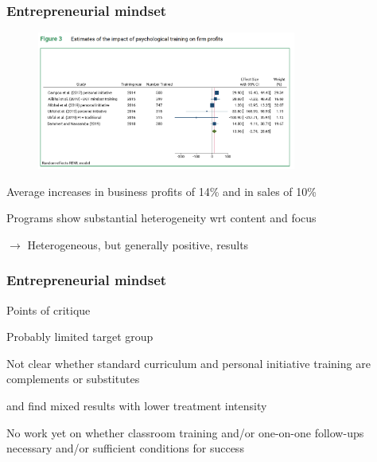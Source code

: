 \documentclass[hideothersubsections, usenames,dvipsnames,11pt]{beamer}
\newenvironment{itemize_2pt}{\itemize\addtolength{\itemsep}{2pt}}{\enditemize}
\begin{document}
\begin{frame}
\frametitle{Entrepreneurial mindset}

\begin{figure}[htbp]
	\centering
	\includegraphics[width=23em]{pics/McKenzie2020_mindset.png}
	\label{McKenzie (2020): Mindset}
\end{figure}

\vspace{-1.0em}

\begin{itemize_2pt}
	\item \textcolor{bdf}{Average increases in business profits of 14\% and in sales of 10\%}
	\item Programs show \textcolor{bdf}{substantial heterogeneity} wrt content and focus
	\item[] $\rightarrow$ Heterogeneous, but generally positive, results
\end{itemize_2pt}
\end{frame}

\begin{frame}
\frametitle{Entrepreneurial mindset}

Points of critique
\begin{itemize_2pt}
	\item \textcolor{bdf}{Probably limited target group}
	\item Not clear whether standard curriculum and personal initiative training are \textcolor{bdf}{complements or substitutes}
	\item \citet{Alibhai2019} and \citet{Ubfal2020} find \textcolor{bdf}{mixed results with lower treatment intensity}
	\item No work yet on whether \textcolor{bdf}{classroom training and/or one-on-one follow-ups} necessary and/or sufficient conditions for success
\end{itemize_2pt}
\end{frame}

\end{document}

